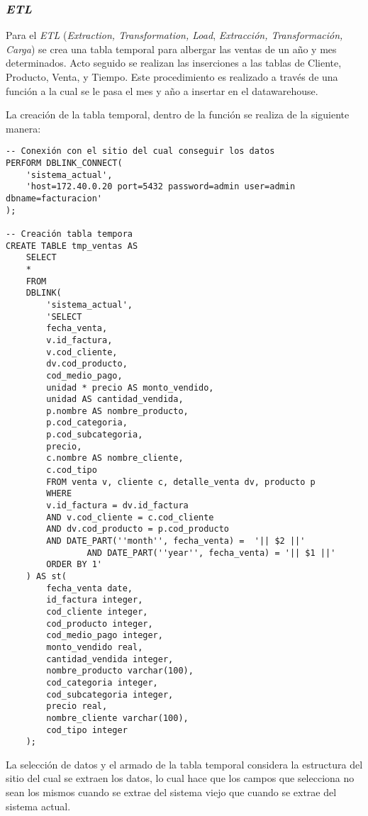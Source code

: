 \subsubsection{\emph{ETL}}

Para el \emph{ETL} (\emph{Extraction, Transformation, Load}, \emph{Extracción, Transformación, Carga}) se crea una tabla temporal para albergar las ventas de un año y mes determinados. Acto seguido se realizan las inserciones a las tablas de Cliente, Producto, Venta, y Tiempo. Este procedimiento es realizado a través de una función a la cual se le pasa el mes y año a insertar en el datawarehouse.

La creación de la tabla temporal, dentro de la función se realiza de la siguiente manera:

\pagebreak

\begin{lstlisting}[title=Creación de la Tabla Temporal]
-- Conexión con el sitio del cual conseguir los datos
PERFORM DBLINK_CONNECT(
    'sistema_actual',
    'host=172.40.0.20 port=5432 password=admin user=admin dbname=facturacion'
);

-- Creación tabla tempora
CREATE TABLE tmp_ventas AS
    SELECT
    * 
    FROM 
    DBLINK(
        'sistema_actual', 
        'SELECT
        fecha_venta,
        v.id_factura,
        v.cod_cliente,
        dv.cod_producto,
        cod_medio_pago,
        unidad * precio AS monto_vendido,
        unidad AS cantidad_vendida,
        p.nombre AS nombre_producto,
        p.cod_categoria,
        p.cod_subcategoria,
        precio,
        c.nombre AS nombre_cliente,
        c.cod_tipo
        FROM venta v, cliente c, detalle_venta dv, producto p
        WHERE 
        v.id_factura = dv.id_factura
        AND v.cod_cliente = c.cod_cliente
        AND dv.cod_producto = p.cod_producto 
        AND DATE_PART(''month'', fecha_venta) =  '|| $2 ||'
                AND DATE_PART(''year'', fecha_venta) = '|| $1 ||'
        ORDER BY 1'
    ) AS st(
        fecha_venta date,
        id_factura integer,
        cod_cliente integer,
        cod_producto integer,
        cod_medio_pago integer,
        monto_vendido real,
        cantidad_vendida integer,
        nombre_producto varchar(100),
        cod_categoria integer,
        cod_subcategoria integer,
        precio real,
        nombre_cliente varchar(100),
        cod_tipo integer
    );
\end{lstlisting}

La selección de datos y el armado de la tabla temporal considera la estructura del sitio del cual se extraen los datos, lo cual hace que los campos que selecciona no sean los mismos cuando se extrae del sistema viejo que cuando se extrae del sistema actual. 


